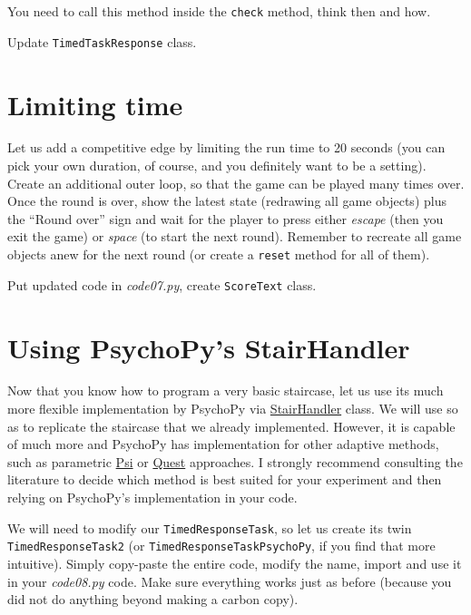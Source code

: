 \documentclass[
]{book}
\begin{document}
You need to call this method inside the \texttt{check} method, think then and how.

Update \texttt{TimedTaskResponse} class.

\hypertarget{limiting-time}{%
\section{Limiting time}\label{limiting-time}}

Let us add a competitive edge by limiting the run time to 20 seconds (you can pick your own duration, of course, and you definitely want to be a setting). Create an additional outer loop, so that the game can be played many times over. Once the round is over, show the latest state (redrawing all game objects) plus the ``Round over'' sign and wait for the player to press either \emph{escape} (then you exit the game) or \emph{space} (to start the next round). Remember to recreate all game objects anew for the next round (or create a \texttt{reset} method for all of them).

Put updated code in \emph{code07.py}, create \texttt{ScoreText} class.

\hypertarget{using-psychopys-stairhandler}{%
\section{Using PsychoPy's StairHandler}\label{using-psychopys-stairhandler}}

Now that you know how to program a very basic staircase, let us use its much more flexible implementation by PsychoPy via \href{https://psychopy.org/api/data.html\#stairhandler}{StairHandler} class. We will use so as to replicate the staircase that we already implemented. However, it is capable of much more and PsychoPy has implementation for other adaptive methods, such as parametric \href{https://psychopy.org/api/data.html\#psychopy.data.PsiHandler}{Psi} or \href{https://psychopy.org/api/data.html\#questhandler}{Quest} approaches. I strongly recommend consulting the literature to decide which method is best suited for your experiment and then relying on PsychoPy's implementation in your code.

We will need to modify our \texttt{TimedResponseTask}, so let us create its twin \texttt{TimedResponseTask2} (or \texttt{TimedResponseTaskPsychoPy}, if you find that more intuitive). Simply copy-paste the entire code, modify the name, import and use it in your \emph{code08.py} code. Make sure everything works just as before (because you did not do anything beyond making a carbon copy).
\end{document}

